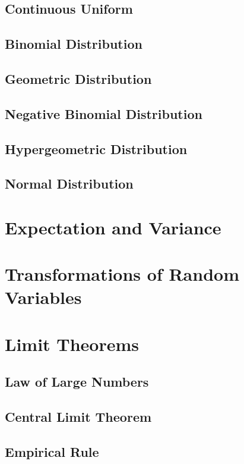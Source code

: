 \documentclass[12pt]{book}
\begin{document}
\subsection{Continuous Uniform}
\subsection{Binomial Distribution}
\subsection{Geometric Distribution}
\subsection{Negative Binomial Distribution}
\subsection{Hypergeometric Distribution}
\subsection{Normal Distribution}

\section{Expectation and Variance}

\section{Transformations of Random Variables}

\section{Limit Theorems}

\subsection{Law of Large Numbers}

\subsection{Central Limit Theorem}

\subsection{Empirical Rule}
\end{document}
